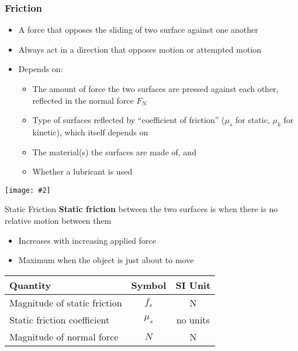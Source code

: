 \documentclass[12pt,compress,aspectratio=169]{beamer}
\newcommand{\pic}[2]{\texttt{[image: \#2]}}
\newcommand{\eq}[2]{\vspace{#1}{\Large\begin{displaymath}#2\end{displaymath}}}
\begin{document}
\begin{frame}
  \frametitle{Friction}
  \begin{itemize}
  \item A force that opposes the sliding of two surface against one another
  \item Always act in a direction that opposes motion or attempted motion
  \item Depends on:
    \begin{itemize}
    \item The amount of force the two surfaces are pressed against each other,
      reflected in the normal force $F_N$
    \item Type of surfaces reflected by ``coefficient of friction''
      ($\mu_s$ for static, $\mu_k$ for kinetic), which itself depends on
    \item The material(s) the surfaces are made of, and
    \item Whether a lubricant is used
    \end{itemize}
  \end{itemize}
  \begin{center}
    \vspace{-.1in}
    \pic{.5}{graphics/friction.jpg}
  \end{center}
\end{frame}



\begin{frame}{Static Friction}
  \textbf{Static friction} between the two surfaces is when there is no
  relative motion between them
  \begin{itemize}
  \item Increases with increasing applied force
  \item Maximum when the object is just about to move
  \end{itemize}

  \eq{-.2in}{
    \boxed{f_s\leq\mu_sN}
  }
  \begin{center}
    \begin{tabular}{l|c|c}
      \rowcolor{pink}
      \textbf{Quantity} & \textbf{Symbol} & \textbf{SI Unit} \\ \hline
      Magnitude of static friction & $f_s$ & \si{\newton} \\
      Static friction coefficient  & $\mu_s$ & no units \\
      Magnitude of normal force    & $N$ & \si{\newton}
    \end{tabular}
  \end{center}
\end{frame}
\end{document}
